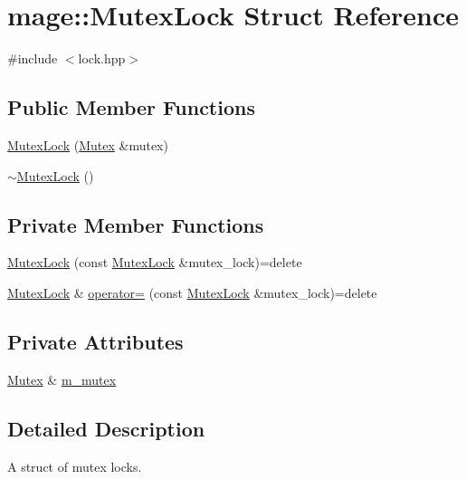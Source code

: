 \hypertarget{structmage_1_1_mutex_lock}{}\section{mage\+:\+:Mutex\+Lock Struct Reference}
\label{structmage_1_1_mutex_lock}


{\ttfamily \#include $<$lock.\+hpp$>$}

\subsection*{Public Member Functions}
\begin{DoxyCompactItemize}
\item 
\hyperlink{structmage_1_1_mutex_lock_aa8cd93677eec2656ca217fdf79f911c4}{Mutex\+Lock} (\hyperlink{classmage_1_1_mutex}{Mutex} \&mutex)
\item 
\hyperlink{structmage_1_1_mutex_lock_a2631e8878646b2d25b136b6adb55d553}{$\sim$\+Mutex\+Lock} ()
\end{DoxyCompactItemize}
\subsection*{Private Member Functions}
\begin{DoxyCompactItemize}
\item 
\hyperlink{structmage_1_1_mutex_lock_a20b0f44c31bcb2040cbf23f071870af9}{Mutex\+Lock} (const \hyperlink{structmage_1_1_mutex_lock}{Mutex\+Lock} \&mutex\+\_\+lock)=delete
\item 
\hyperlink{structmage_1_1_mutex_lock}{Mutex\+Lock} \& \hyperlink{structmage_1_1_mutex_lock_a739909161a9a9ca0fc8143ac84967765}{operator=} (const \hyperlink{structmage_1_1_mutex_lock}{Mutex\+Lock} \&mutex\+\_\+lock)=delete
\end{DoxyCompactItemize}
\subsection*{Private Attributes}
\begin{DoxyCompactItemize}
\item 
\hyperlink{classmage_1_1_mutex}{Mutex} \& \hyperlink{structmage_1_1_mutex_lock_a1c796e1e66bd49007fe746d1425b82f4}{m\+\_\+mutex}
\end{DoxyCompactItemize}


\subsection{Detailed Description}
A struct of mutex locks. 

